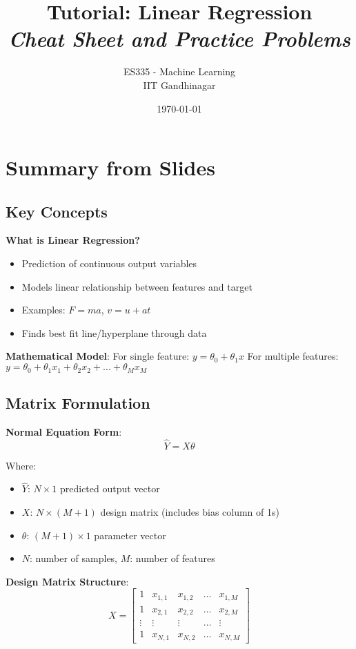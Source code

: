 \documentclass{article}
\title{\textbf{Tutorial: Linear Regression} \\ \textit{Cheat Sheet and Practice Problems}}
\author{ES335 - Machine Learning \\ IIT Gandhinagar}
\date{\today}
\begin{document}
\maketitle

\section{Summary from Slides}

\subsection{Key Concepts}

\textbf{What is Linear Regression?}
\begin{itemize}
    \item Prediction of continuous output variables
    \item Models linear relationship between features and target
    \item Examples: $F = ma$, $v = u + at$
    \item Finds best fit line/hyperplane through data
\end{itemize}

\textbf{Mathematical Model}:
For single feature: $y = \theta_0 + \theta_1 x$
For multiple features: $y = \theta_0 + \theta_1 x_1 + \theta_2 x_2 + ... + \theta_M x_M$

\subsection{Matrix Formulation}

\textbf{Normal Equation Form}:
$$\hat{Y} = X\theta$$

Where:
\begin{itemize}
    \item $\hat{Y}$: $N \times 1$ predicted output vector
    \item $X$: $N \times (M+1)$ design matrix (includes bias column of 1s)
    \item $\theta$: $(M+1) \times 1$ parameter vector
    \item $N$: number of samples, $M$: number of features
\end{itemize}

\textbf{Design Matrix Structure}:
$$X = \begin{bmatrix}
1 & x_{1,1} & x_{1,2} & \dots & x_{1,M}\\
1 & x_{2,1} & x_{2,2} & \dots & x_{2,M}\\
\vdots & \vdots & \vdots & \dots & \vdots\\
1 & x_{N,1} & x_{N,2} & \dots & x_{N,M}
\end{bmatrix}$$
\end{document}
